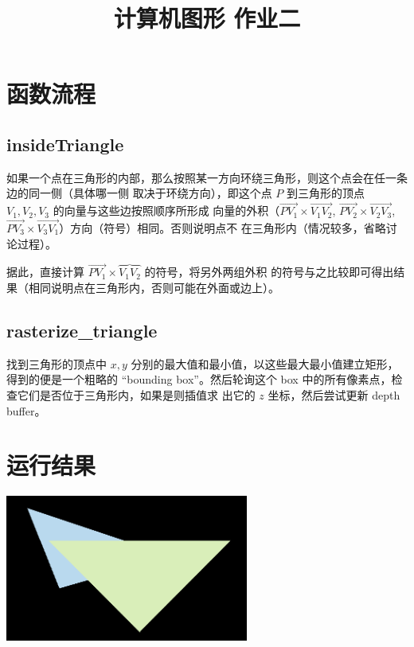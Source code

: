 \documentclass{ctexart}
\title{计算机图形 作业二}
\author{\theauthor}
\begin{document}
    \maketitle

    \section{函数流程}

    \subsection{insideTriangle}

    如果一个点在三角形的内部，那么按照某一方向环绕三角形，则这个点会在任一条边的同一侧（具体哪一侧
    取决于环绕方向），即这个点 $P$ 到三角形的顶点 $V_1, V_2, V_3$ 的向量与这些边按照顺序所形成
    向量的外积（$\overrightarrow{PV_1}\times\overrightarrow{V_1V_2}$, 
    $\overrightarrow{PV_2}\times\overrightarrow{V_2V_3}$,
    $\overrightarrow{PV_3}\times\overrightarrow{V_3V_1}$）方向（符号）相同。否则说明点不
    在三角形内（情况较多，省略讨论过程）。

    据此，直接计算 $\overrightarrow{PV_1}\times\overbrace{V_1V_2}$ 的符号，将另外两组外积
    的符号与之比较即可得出结果（相同说明点在三角形内，否则可能在外面或边上）。

    \subsection{rasterize\_triangle}

    找到三角形的顶点中 $x, y$ 分别的最大值和最小值，以这些最大最小值建立矩形，得到的便是一个粗略的
    ``bounding box''。然后轮询这个 box 中的所有像素点，检查它们是否位于三角形内，如果是则插值求
    出它的 $z$ 坐标，然后尝试更新 depth buffer。

    \section{运行结果}

    \begin{center}
        \includegraphics[width=0.6\textwidth]{pics/result.png}
    \end{center}
\end{document}
